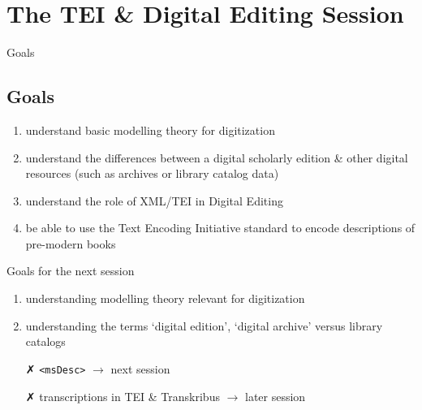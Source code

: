 \section{The TEI \& Digital Editing Session}

\begin{frame}{Goals}
\subsection{Goals}
\begin{enumerate}
    \item understand basic modelling theory for digitization 
    \item understand the differences between a digital scholarly edition \& other digital resources (such as archives or library catalog data)
    \item understand the role of XML/TEI in Digital Editing
    \item be able to use the Text Encoding Initiative standard to encode descriptions of pre-modern books
\end{enumerate}

    \begin{block}{Goals for the next session}
    \begin{enumerate}
        \item understanding modelling theory relevant for digitization
        \item understanding the terms `digital edition', `digital archive' versus library catalogs
        \item[\textcolor{alert}{\faClose}] \texttt{<msDesc>} $\to$ next session
        \item[\textcolor{alert}{\faClose}] transcriptions in TEI \& Transkribus $\to$ later session
    \end{enumerate}
    \end{block}
\end{frame}


